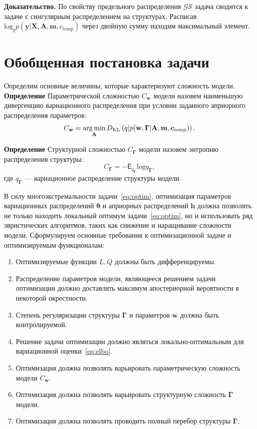 \textbf{Доказательство.}
По свойству предельного распределения $\mathcal{GS}$ задача сводится к задаче с сингулярным распределением на структурах.
Расписав $\text{log}_q {p}(\mathbf{y}|\mathbf{X},\mathbf{A},\mathbf{m}, c_{\text{temp}})$ через двойную сумму находим максимальный элемент.


\section{Обобщенная постановка задачи}
Определим основные величины, которые характеризуют сложность модели. \\

\textbf{Определение} Параметрической сложностью $C_{\mathbf{w}}$ модели назовем наименьшую дивергенцию вариационного распределения при условии заданного априорного распределения параметров:
\[
    C_{\mathbf{w}} = \operatorname*{arg\,min}_\mathbf{A} D_\text{KL}\left(q|p(\mathbf{w}, \boldsymbol{\Gamma}|\mathbf{A}, \mathbf{m}, {\boldsymbol{c}_\text{temp}})\right).
\]

\textbf{Определение} Структурной сложностью $C_{\boldsymbol{\Gamma}}$ модели назовем энтропию распределения структуры:
\[
    C_{\boldsymbol{\Gamma}} = -\mathsf{E}_{q_{\boldsymbol{\Gamma}}} \text{log}q_{\boldsymbol{\Gamma}},
\]
где $q_{\boldsymbol{\Gamma}}$ --- вариационное распределение структуры модели.

В силу многоэкстремальности задачи~\eqref{eq:optim}, оптимизация параметров вариационных распределений $\boldsymbol{\theta}$ и априорных распределений $\mathbf{h}$ должна позволять не только находить локальный оптимум задачи~\eqref{eq:optim}, но и использовать ряд эвристических алгоритмов, таких как снижение и наращивание сложности модели. 
Сформулируем основные требования к оптимизационной задаче и оптимизируемым функционалам:
\begin{enumerate}
\item Оптимизируемые функции $L,Q$ должны быть дифференцируемы.
\item Распределение параметров модели, являющееся решением задачи оптимизации должно доставлять максимум апостериорной вероятности в некоторой окрестности.
\item Степень регуляризации структуры $\boldsymbol{\Gamma}$ и параметров $\mathbf{w}$ должна быть контролируемой.
\item Решение задачи оптимизации должно являться локально-оптимальным для вариационной оценки~\eqref{eq:elbo}.
\item Оптимизация должна позволять варьировать параметрическую сложность модели $C_{\mathbf{w}}$.
\item Оптимизация должна позволять варьировать структурную сложность ${\boldsymbol{\Gamma}}$ модели.
\item Оптимизация должна позволять проводить полный перебор структуры $\boldsymbol{\Gamma}$.
\end{enumerate}


